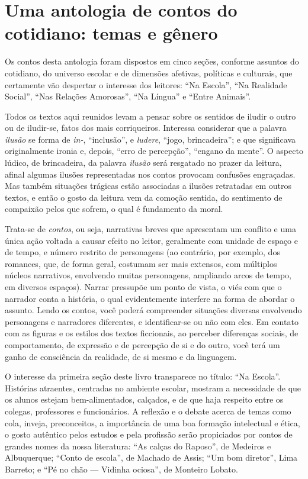\chapter{Uma antologia de contos do cotidiano: temas e gênero}
 
Os contos desta antologia foram dispostos em cinco
seções, conforme assuntos do cotidiano, do universo escolar e de
dimensões afetivas, políticas e culturais, que certamente vão despertar
o interesse dos leitores: ``Na Escola'', ``Na Realidade Social'', ``Nas
Relações Amorosas'', ``Na Língua'' e ``Entre Animais''.

Todos os textos aqui reunidos levam a pensar sobre os sentidos de iludir
o outro ou de iludir-se, fatos dos mais corriqueiros. Interessa
considerar que a palavra \emph{ilusão} se forma de \emph{in-},
``inclusão'', e \emph{ludere}, ``jogo, brincadeira''; e que significava
originalmente ironia e, depois, ``erro de percepção'', ``engano da
mente''. O aspecto lúdico, de brincadeira, da palavra \emph{ilusão} será
resgatado no prazer da leitura, afinal algumas ilusões representadas nos
contos provocam confusões engraçadas. Mas também situações trágicas
estão associadas a ilusões retratadas em outros textos, e então o gosto
da leitura vem da comoção sentida, do sentimento de compaixão pelos que
sofrem, o qual é fundamento da moral.

Trata-se de \emph{contos}, ou seja, narrativas breves que apresentam um conflito e uma
única ação voltada a causar efeito no leitor, geralmente com unidade de
espaço e de tempo, e número restrito de personagens (ao contrário, por exemplo, dos romances, que, de forma geral, costumam ser mais extensos, com múltiplos núcleos narrativos, envolvendo muitas personagens, ampliando arcos de tempo, em diversos espaços). Narrar pressupõe um
ponto de vista, o viés com que o narrador conta a história, o qual
evidentemente interfere na forma de abordar o assunto. Lendo os contos,
você poderá compreender situações diversas envolvendo personagens e
narradores diferentes, e identificar-se ou não com eles. Em contato com
as figuras e os estilos dos textos ficcionais, ao perceber diferenças
sociais, de comportamento, de expressão e de percepção de si e do outro,
você terá um ganho de consciência da realidade, de si mesmo e da
linguagem.

O interesse da primeira seção deste livro transparece no título: ``Na
Escola''. Histórias atraentes, centradas no ambiente escolar, mostram a
necessidade de que os alunos estejam bem-alimentados, calçados, e de que
haja respeito entre os colegas, professores e funcionários. A reflexão e
o debate acerca de temas como cola, inveja, preconceitos, a importância
de uma boa formação intelectual e ética, o gosto autêntico pelos estudos
e pela profissão serão propiciados por contos de grandes nomes da nossa
literatura: ``As calças do Raposo'', de Medeiros e Albuquerque; ``Conto
de escola'', de Machado de Assis; ``Um bom diretor'', Lima Barreto; e
``Pé no chão --- Vidinha ociosa'', de Monteiro Lobato.

